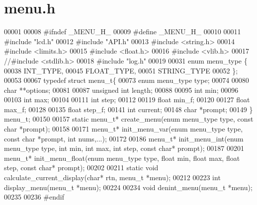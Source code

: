 \section{menu.\+h}
\label{menu_8h_source}

\begin{DoxyCode}
00001 
00008 \textcolor{preprocessor}{#ifndef \_MENU\_H\_}
00009 \textcolor{preprocessor}{#define \_MENU\_H\_}
00010 
00011 \textcolor{preprocessor}{#include "lcd.h"}
00012 \textcolor{preprocessor}{#include "API.h"}
00013 \textcolor{preprocessor}{#include <string.h>}
00014 \textcolor{preprocessor}{#include <limits.h>}
00015 \textcolor{preprocessor}{#include <float.h>}
00016 \textcolor{preprocessor}{#include <vlib.h>}
00017 \textcolor{comment}{//#include <stdlib.h>}
00018 \textcolor{preprocessor}{#include "log.h"}
00019 
00031 \textcolor{keyword}{enum} menu_type \{
00038   INT_TYPE,
00045   FLOAT_TYPE,
00051   STRING_TYPE
00052 \};
00053 
00067 \textcolor{keyword}{typedef} \textcolor{keyword}{struct }menu_t\{
00073   \textcolor{keyword}{enum} menu_type type;
00074 
00080   \textcolor{keywordtype}{char} **options;
00081 
00087   \textcolor{keywordtype}{unsigned} \textcolor{keywordtype}{int} length;
00088 
00095   \textcolor{keywordtype}{int} min;
00096 
00103   \textcolor{keywordtype}{int} max;
00104 
00111   \textcolor{keywordtype}{int} step;
00112 
00119   \textcolor{keywordtype}{float} min_f;
00120 
00127   \textcolor{keywordtype}{float} max_f;
00128 
00135   \textcolor{keywordtype}{float} step_f;
00141   \textcolor{keywordtype}{int} current;
00148   \textcolor{keywordtype}{char} *prompt;
00149 \} menu_t;
00150 
00157 \textcolor{keyword}{static} menu_t* create_menu(\textcolor{keyword}{enum} menu_type type, \textcolor{keyword}{const} \textcolor{keywordtype}{char} *prompt);
00158 
00171 menu_t* init_menu_var(\textcolor{keyword}{enum} menu_type type, \textcolor{keyword}{const} \textcolor{keywordtype}{char} *prompt, \textcolor{keywordtype}{int} nums,...);
00172 
00186 menu_t* init_menu_int(\textcolor{keyword}{enum} menu_type type, \textcolor{keywordtype}{int} min, \textcolor{keywordtype}{int} max, \textcolor{keywordtype}{int} step, \textcolor{keyword}{const} \textcolor{keywordtype}{char}* 
      prompt);
00187 
00201 menu_t* init_menu_float(\textcolor{keyword}{enum} menu_type type, \textcolor{keywordtype}{float} min, \textcolor{keywordtype}{float} max, \textcolor{keywordtype}{float} step, \textcolor{keyword}{const} \textcolor{keywordtype}{char}* 
      prompt);
00202 
00211 \textcolor{keyword}{static} \textcolor{keywordtype}{void} calculate_current_display(\textcolor{keywordtype}{char}* rtn, menu_t *menu);
00212 
00223 \textcolor{keywordtype}{int} display_menu(menu_t *menu);
00224 
00234 \textcolor{keywordtype}{void} denint_menu(menu_t *menu);
00235 
00236 \textcolor{preprocessor}{#endif}
\end{DoxyCode}
